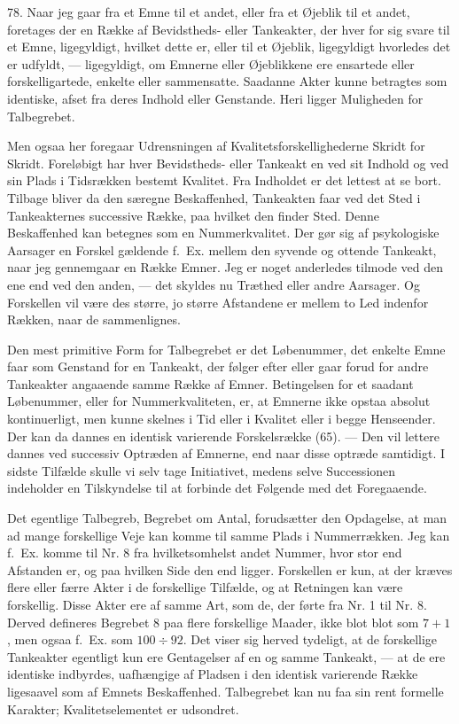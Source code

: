 \documentclass[12pt,a4paper]{book}
\newcommand{\opage}[1]{\marginnote{\footnotesize\textit{[#1]}}}
\newcommand{\apage}[1]{\marginnote{\footnotesize\textit{[#1]}}}
\begin{document}
78. Naar jeg gaar fra et Emne til et andet, eller fra et Øjeblik til et
andet, foretages der en Række af Bevidstheds- eller Tankeakter, der
hver for sig svare til et Emne, ligegyldigt, hvilket dette er, eller til
et Øjeblik, ligegyldigt hvorledes det er udfyldt, --- ligegyldigt, om
Emnerne eller Øjeblikkene ere ensartede eller forskelligartede, enkelte
eller \apage{190} sammensatte. Saadanne Akter kunne betragtes som identiske, afset
fra deres Indhold eller Genstande. Heri ligger Muligheden for
Talbegrebet.

Men ogsaa her foregaar Udrensningen af Kvalitetsforskellighederne Skridt
for Skridt. Foreløbigt har hver Bevidstheds- eller Tankeakt en ved sit
Indhold og ved sin Plads i Tidsrækken bestemt Kvalitet. Fra Indholdet er
det lettest at se bort. Tilbage bliver da den særegne Beskaffenhed,
Tankeakten faar ved det Sted i Tankeakternes successive Række, paa
hvilket den finder Sted. Denne Beskaffenhed kan betegnes som en
Nummerkvalitet. Der gør sig af psykologiske Aarsager en Forskel
gældende f.\ Ex. mellem den syvende og ottende Tankeakt, naar jeg
gennemgaar en Række Emner. Jeg er noget anderledes tilmode ved den ene
end ved den anden, --- det skyldes nu Træthed eller andre Aarsager. Og
Forskellen vil være des større, jo større Afstandene er mellem to Led
indenfor Rækken, naar de sammenlignes.

Den mest primitive Form for Talbegrebet er det Løbenummer, det enkelte
Emne faar som Genstand for en Tankeakt, der følger efter eller gaar
forud for andre Tankeakter angaaende samme Række af Emner. Betingelsen
for et saadant Løbenummer, eller for Nummerkvaliteten, er, at Emnerne
ikke opstaa absolut kontinuerligt, men kunne skelnes i Tid eller i
Kvalitet eller i begge Henseender. Der kan da dannes en identisk
varierende Forskelsrække (65). --- Den vil lettere dannes ved successiv
Optræden af Emnerne, end naar disse optræde samtidigt. I sidste Tilfælde
skulle vi selv tage Initiativet, medens selve Successionen indeholder en
Tilskyndelse til at forbinde det Følgende med det Foregaaende.

Det egentlige Talbegreb, Begrebet om Antal, forudsætter den Opdagelse,
at man ad mange forskellige Veje kan komme til samme Plads i
Nummerrækken. Jeg kan f.\ Ex. komme til Nr. 8 fra hvilketsomhelst andet
Nummer, hvor stor end Afstanden er, og paa hvilken Side den end ligger.
Forskellen er kun, at der kræves flere eller færre Akter i de
forskellige Tilfælde, og at Retningen kan være forskellig. Disse Akter
ere af samme Art, som de, der førte fra Nr. 1 til Nr. 8. Derved
defineres Begrebet 8 paa flere forskellige Maader, ikke blot
\opage{191}blot som
$7+1$, men ogsaa f.\ Ex. som $100 \div 92$. Det viser sig herved
tydeligt, at de forskellige Tankeakter egentligt kun ere Gentagelser af
en og samme Tankeakt, --- at de ere identiske indbyrdes, uafhængige af
Pladsen i den identisk varierende Række ligesaavel som af Emnets
Beskaffenhed. Talbegrebet kan nu faa sin rent formelle Karakter;
Kvalitetselementet er udsondret.
\end{document}
